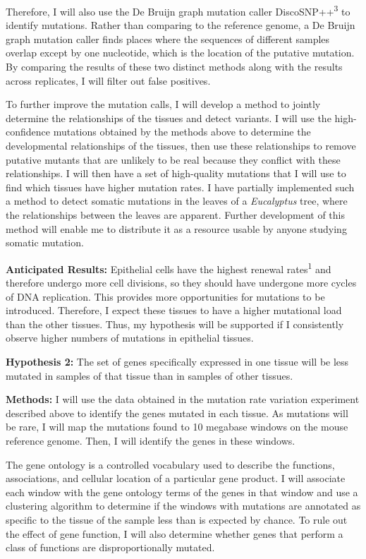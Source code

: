 \documentclass[12pt]{article}
\begin{document}
Therefore, I will also use the De Bruijn graph mutation caller DiscoSNP++\textsuperscript{3} to identify mutations.
Rather than comparing to the reference genome, a De Bruijn graph mutation caller finds places where the sequences of different samples overlap except by one nucleotide, which is the location of the putative mutation.
By comparing the results of these two distinct methods along with the results across replicates, I will filter out false positives.

To further improve the mutation calls, I will develop a method to jointly determine the relationships of the tissues and detect variants.
I will use the high-confidence mutations obtained by the methods above to determine the developmental relationships of the tissues, then use these relationships to remove putative mutants that are unlikely to be real because they conflict with these relationships.
I will then have a set of high-quality mutations that I will use to find which tissues have higher mutation rates.
I have partially implemented such a method to detect somatic mutations in the leaves of a \textit{Eucalyptus} tree, where the relationships between the leaves are apparent. Further development of this method will enable me to distribute it as a resource usable by anyone studying somatic mutation.

\textbf{Anticipated Results:}
Epithelial cells have the highest renewal rates\textsuperscript{1} and therefore undergo more cell divisions, so they should have undergone more cycles of DNA replication.
This provides more opportunities for mutations to be introduced.
Therefore, I expect these tissues to have a higher mutational load than the other tissues.
Thus, my hypothesis will be supported if I consistently observe higher numbers of mutations in epithelial tissues.

\textbf{Hypothesis 2:}
The set of genes specifically expressed in one tissue will be less mutated in samples of that tissue than in samples of other tissues.

\textbf{Methods:}
I will use the data obtained in the mutation rate variation experiment described above to identify the genes mutated in each tissue.
As mutations will be rare, I will map the mutations found to 10 megabase windows on the mouse reference genome.
Then, I will identify the genes in these windows.

The gene ontology is a controlled vocabulary used to describe the functions, associations, and cellular location of a particular gene product.
I will associate each window with the gene ontology terms of the genes in that window and use a clustering algorithm to determine if the windows with mutations are annotated as specific to the tissue of the sample less than is expected by chance.
To rule out the effect of gene function, I will also determine whether genes that perform a class of functions are disproportionally mutated.
\end{document}
